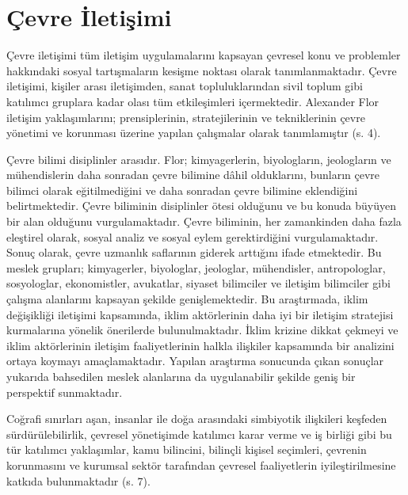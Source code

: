\documentclass[
]{book}
\begin{document}
\hypertarget{uxe7evre-iletiux15fimi}{%
\section{Çevre İletişimi}\label{uxe7evre-iletiux15fimi}}

Çevre iletişimi tüm iletişim uygulamalarını kapsayan çevresel konu ve problemler hakkındaki sosyal tartışmaların kesişme noktası olarak tanımlanmaktadır. Çevre iletişimi, kişiler arası iletişimden, sanat topluluklarından sivil toplum gibi katılımcı gruplara kadar olası tüm etkileşimleri içermektedir. Alexander Flor iletişim yaklaşımlarını; prensiplerinin, stratejilerinin ve tekniklerinin çevre yönetimi ve korunması üzerine yapılan çalışmalar olarak tanımlamıştır (s. 4). \citep{flor2004environmental}

Çevre bilimi disiplinler arasıdır. Flor; kimyagerlerin, biyologların, jeologların ve mühendislerin daha sonradan çevre bilimine dâhil olduklarını, bunların çevre bilimci olarak eğitilmediğini ve daha sonradan çevre bilimine eklendiğini belirtmektedir. Çevre biliminin disiplinler ötesi olduğunu ve bu konuda büyüyen bir alan olduğunu vurgulamaktadır. Çevre biliminin, her zamankinden daha fazla eleştirel olarak, sosyal analiz ve sosyal eylem gerektirdiğini vurgulamaktadır. Sonuç olarak, çevre uzmanlık saflarının giderek arttığını ifade etmektedir. Bu meslek grupları; kimyagerler, biyologlar, jeologlar, mühendisler, antropologlar, sosyologlar, ekonomistler, avukatlar, siyaset bilimciler ve iletişim bilimciler gibi çalışma alanlarını kapsayan şekilde genişlemektedir. \citep{flor2004environmental} Bu araştırmada, iklim değişikliği iletişimi kapsamında, iklim aktörlerinin daha iyi bir iletişim stratejisi kurmalarına yönelik önerilerde bulunulmaktadır. İklim krizine dikkat çekmeyi ve iklim aktörlerinin iletişim faaliyetlerinin halkla ilişkiler kapsamında bir analizini ortaya koymayı amaçlamaktadır. Yapılan araştırma sonucunda çıkan sonuçlar yukarıda bahsedilen meslek alanlarına da uygulanabilir şekilde geniş bir perspektif sunmaktadır.

Coğrafi sınırları aşan, insanlar ile doğa arasındaki simbiyotik ilişkileri keşfeden sürdürülebilirlik, çevresel yönetişimde katılımcı karar verme ve iş birliği gibi bu tür katılımcı yaklaşımlar, kamu bilincini, bilinçli kişisel seçimleri, çevrenin korunmasını ve kurumsal sektör tarafından çevresel faaliyetlerin iyileştirilmesine katkıda bulunmaktadır (s. 7). \citep{fyfe2010advanced}
\end{document}
